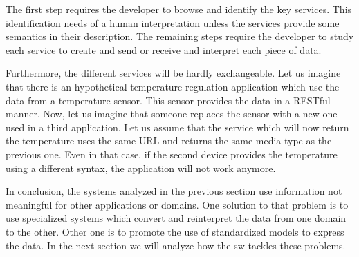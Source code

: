 
The first step requires the developer to browse and identify the key services.
This identification needs of a human interpretation unless the services provide some semantics in their description. %
The remaining steps require the developer to study each service to create and send or receive and interpret each piece of data.

Furthermore, the different services will be hardly exchangeable.
Let us imagine that there is an hypothetical temperature regulation application which use the data from a temperature sensor.
This sensor provides the data in a RESTful manner.
Now, let us imagine that someone replaces the sensor with a new one used in a third application.
Let us assume that the service which will now return the temperature uses the same URL and returns the same media-type as the previous one.
Even in that case, if the second device provides the temperature using a different syntax, the application will not work anymore.

\medskip


In conclusion, the systems analyzed in the previous section use information not meaningful for other applications or domains.
One solution to that problem is to use specialized systems which convert and reinterpret the data from one domain to the other.
Other one is to promote the use of standardized models to express the data.
In the next section we will analyze how the \acl{sw} tackles these problems.